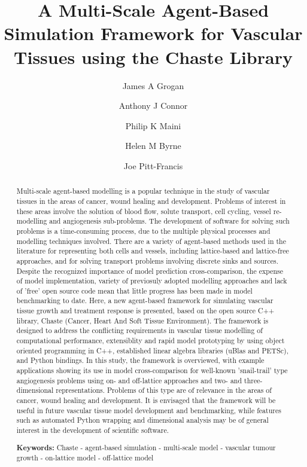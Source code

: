 \documentclass[superscriptaddress, a4paper]{article}
\begin{document}
\title{A Multi-Scale Agent-Based Simulation Framework for Vascular Tissues using the Chaste Library}

\author[1]{James A Grogan}
\author[1,2]{Anthony J Connor}
\author[1]{Philip K Maini}
\author[1]{Helen M Byrne}
\author[2]{Joe Pitt-Francis}
 
  
\date{}
  
\maketitle

\begin{abstract}
Multi-scale agent-based modelling is a popular technique in the study of vascular tissues in the areas of cancer, wound healing and development. Problems of interest in these areas involve the solution of blood flow, solute transport, cell cycling, vessel re-modelling and angiogenesis sub-problems. The development of software for solving such problems is a time-consuming process, due to the multiple physical processes and modelling techniques involved. There are a variety of agent-based methods used in the literature for representing both cells and vessels, including lattice-based and lattice-free approaches, and for solving transport problems involving discrete sinks and sources. Despite the recognized importance of model prediction cross-comparison, the expense of model implementation, variety of previosuly adopted modelling approaches and lack of 'free' open source code mean that little progress has been made in model benchmarking to date. Here, a new agent-based framework for simulating vascular tissue growth and treatment response is presented, based on the open source C++ library, Chaste (Cancer, Heart And Soft Tissue Environment). The framework is designed to address the conflicting requirements in vascular tissue modelling of computational performance, extensiblity and rapid model prototyping by using object oriented programming in C++, established linear algebra libraries (uBlas and PETSc), and Python bindings. In this study, the framework is overviewed, with example applications showing its use in model cross-comparison for well-known 'snail-trail' type angiogenesis problems using on- and off-lattice approaches and two- and three-dimensional representations. Problems of this type are of relevance in the areas of cancer, wound healing and development. It is envisaged that the framework will be useful in future vascular tissue model development and benchmarking, while features such as automated Python wrapping and dimensional analysis may be of general interest in the development of scientific software.

\smallskip
\noindent \textbf{Keywords:} Chaste - agent-based simulation - multi-scale model - vascular tumour growth - on-lattice model - off-lattice model

\end{abstract}
\end{document}
